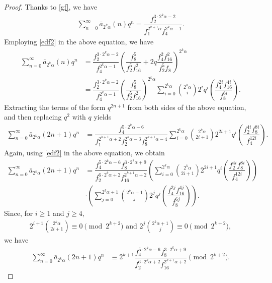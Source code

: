 \documentclass[11pt,a4paper]{article}
\numberwithin{equation}{section}
\theoremstyle{plain}
\begin{document}
	\begin{proof}
	Thanks to \eqref{gf}, we have
	\begin{align}
		\sum_{n=0}^{\infty}\bar{a}_{2^k\alpha}(n)q^n=\dfrac{f_2^{3\cdot2^k\alpha-2}}{f_1^{2^{k+1}\alpha}f_4^{2^k\alpha-1}}.
	\end{align}
	Employing \eqref{edf2} in the above equation, we have
	\begin{align*}
		\sum_{n=0}^{\infty}\bar{a}_{2^k\alpha}(n)q^n&=\dfrac{f_2^{3\cdot2^k\alpha-2}}{f_4^{2^k\alpha-1}}\left(\dfrac{f_8^5}{f_2^5f_{16}^2}+2q\dfrac{f_4^2f_{16}^2}{f_2^5f_8}\right)^{2^k\alpha}\\
		&=\dfrac{f_2^{3\cdot2^k\alpha-2}}{f_4^{2^k\alpha-1}}\left(\dfrac{f_8^5}{f_2^5f_{16}^2}\right)^{2^k\alpha}\sum_{i=0}^{2^k\alpha}\binom{2^k\alpha}{i}2^iq^i\left(\dfrac{f_4^{2i}f_{16}^{4i}}{f_8^{6i}}\right).
	\end{align*}
	Extracting the terms of the form $q^{2n+1}$ from both sides of the above equation, and then replacing $q^{2}$ with $q$ yields
	\begin{align*}
		\sum_{n=0}^{\infty}\bar{a}_{2^k\alpha}(2n+1)q^n&=\dfrac{f_4^{5\cdot2^k\alpha-6}}{f_1^{2^{k+1}\alpha+2}f_2^{2^k\alpha-3}f_8^{2^{k+1}\alpha-4}}\sum_{i=0}^{2^k\alpha}\binom{2^k\alpha}{2i+1}2^{2i+1}q^i\left(\dfrac{f_2^{4i}f_{8}^{8i}}{f_4^{12i}}\right).
	\end{align*}
	Again, using \eqref{edf2} in the above equation, we obtain
	\begin{align}\label{el0}
		\sum_{n=0}^{\infty}\bar{a}_{2^k\alpha}(2n+1)q^n&=\dfrac{f_4^{5\cdot2^k\alpha-6}f_8^{3\cdot2^k\alpha+9}}{f_2^{6\cdot2^{k}\alpha+2}f_{16}^{2^{k+1}\alpha+2}}\left(\sum_{i=0}^{2^k\alpha}\binom{2^k\alpha}{2i+1}2^{2i+1}q^i\left(\dfrac{f_2^{4i}f_{8}^{8i}}{f_4^{12i}}\right)\right)\nonumber\\
		&\cdot\left(\sum_{j=0}^{2^k\alpha+1}\binom{2^k\alpha+1}{j}2^jq^j\left(\dfrac{f_4^{2j}f_{16}^{4j}}{f_8^{6j}}\right)\right).
	\end{align}
	Since, for $i\ge1$ and $j\ge4$,
	\begin{align*}
		2^{i+1}\binom{2^k\alpha}{2i+1}\equiv 0\pmod{2^{k+2}} \text{ and } 2^j\binom{2^k\alpha+1}{j}\equiv 0\pmod{2^{k+2}},
	\end{align*}
we have
	\begin{align}\label{el1}
	\sum_{n=0}^{\infty}\bar{a}_{2^k\alpha}(2n+1)q^n&\equiv2^{k+1} \dfrac{f_4^{5\cdot2^k\alpha-6}f_8^{3\cdot2^k\alpha+9}}{f_2^{6\cdot2^{k}\alpha+2}f_{16}^{2^{k+1}\alpha+2}}\pmod {2^{k+2}}.
	\end{align}

\end{proof}
\end{document}

